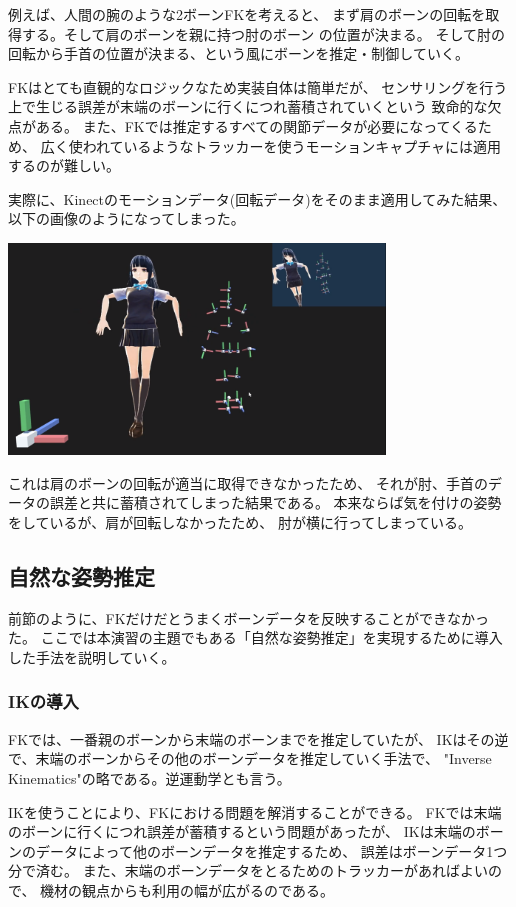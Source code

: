 \documentclass[a4j]{jsarticle}
\begin{document}
例えば、人間の腕のような2ボーンFKを考えると、
まず肩のボーンの回転を取得する。そして肩のボーンを親に持つ肘のボーン
の位置が決まる。
そして肘の回転から手首の位置が決まる、という風にボーンを推定・制御していく。

FKはとても直観的なロジックなため実装自体は簡単だが、
センサリングを行う上で生じる誤差が末端のボーンに行くにつれ蓄積されていくという
致命的な欠点がある。
また、FKでは推定するすべての関節データが必要になってくるため、
広く使われているようなトラッカーを使うモーションキャプチャには適用するのが難しい。

実際に、Kinectのモーションデータ(回転データ)をそのまま適用してみた結果、
以下の画像のようになってしまった。

\includegraphics[width=10cm]{img/fk-noise}

これは肩のボーンの回転が適当に取得できなかったため、
それが肘、手首のデータの誤差と共に蓄積されてしまった結果である。
本来ならば気を付けの姿勢をしているが、肩が回転しなかったため、
肘が横に行ってしまっている。


\subsection{自然な姿勢推定}

前節のように、FKだけだとうまくボーンデータを反映することができなかった。
ここでは本演習の主題でもある「自然な姿勢推定」を実現するために導入した手法を説明していく。

\subsubsection{IKの導入}

FKでは、一番親のボーンから末端のボーンまでを推定していたが、
IKはその逆で、末端のボーンからその他のボーンデータを推定していく手法で、
"Inverse Kinematics"の略である。逆運動学とも言う。

IKを使うことにより、FKにおける問題を解消することができる。
FKでは末端のボーンに行くにつれ誤差が蓄積するという問題があったが、
IKは末端のボーンのデータによって他のボーンデータを推定するため、
誤差はボーンデータ1つ分で済む。
また、末端のボーンデータをとるためのトラッカーがあればよいので、
機材の観点からも利用の幅が広がるのである。
\end{document}
